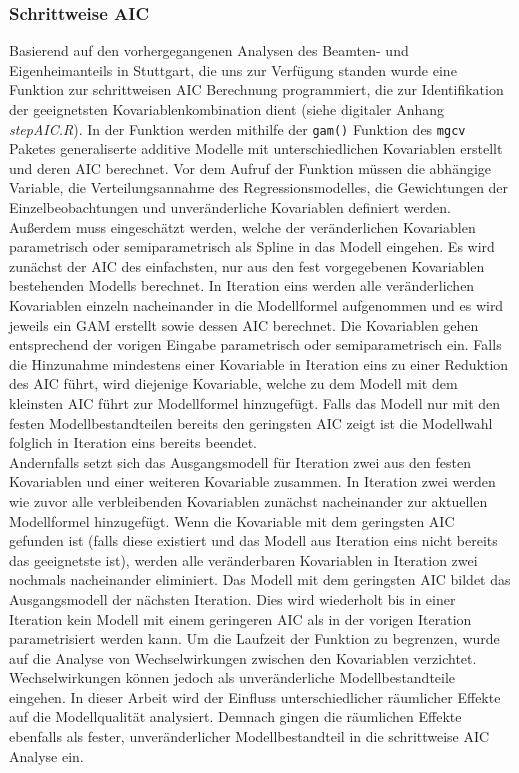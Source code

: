 \documentclass{Vorlage}
\begin{document}
\subsubsection{Schrittweise AIC}
Basierend auf den vorhergegangenen Analysen des Beamten- und Eigenheimanteils in Stuttgart, die uns zur Verfügung standen wurde eine Funktion zur schrittweisen AIC \cite{Akaike1981} Berechnung programmiert, die zur Identifikation der geeignetsten Kovariablenkombination dient (siehe digitaler Anhang \textit{stepAIC.R}). In der Funktion werden mithilfe der \texttt{gam()} Funktion des \texttt{mgcv} 
Paketes \cite{Wood2011} generaliserte additive Modelle mit unterschiedlichen Kovariablen erstellt und deren AIC 
berechnet. Vor dem Aufruf der Funktion müssen die abhängige Variable, die Verteilungsannahme des Regressionsmodelles, 
die Gewichtungen der Einzelbeobachtungen und unveränderliche Kovariablen definiert werden. Außerdem muss eingeschätzt 
werden, welche der veränderlichen Kovariablen parametrisch oder semiparametrisch als Spline in das Modell eingehen. Es 
wird zunächst der AIC des einfachsten, nur aus den fest vorgegebenen Kovariablen bestehenden Modells berechnet. In 
Iteration eins werden alle veränderlichen Kovariablen einzeln nacheinander in die Modellformel aufgenommen und es wird 
jeweils ein GAM erstellt sowie dessen AIC berechnet. Die Kovariablen gehen entsprechend der vorigen Eingabe parametrisch 
oder semiparametrisch ein. Falls die Hinzunahme mindestens einer Kovariable in Iteration eins zu einer Reduktion des AIC 
führt, wird diejenige Kovariable, welche zu dem Modell mit dem kleinsten AIC führt zur Modellformel hinzugefügt. Falls 
das Modell nur mit den festen Modellbestandteilen bereits den geringsten AIC zeigt ist die Modellwahl folglich in 
Iteration eins bereits beendet.\\ 
Andernfalls setzt sich das Ausgangsmodell für Iteration zwei aus den festen 
Kovariablen und einer weiteren Kovariable zusammen. In Iteration zwei werden wie zuvor alle verbleibenden Kovariablen 
zunächst nacheinander zur aktuellen Modellformel hinzugefügt. Wenn die Kovariable mit dem geringsten AIC gefunden ist 
(falls diese existiert und das Modell aus Iteration eins nicht bereits das geeignetste ist), werden alle veränderbaren 
Kovariablen in Iteration zwei nochmals nacheinander eliminiert. Das Modell mit dem geringsten AIC bildet das 
Ausgangsmodell der nächsten Iteration. Dies wird wiederholt bis in einer Iteration kein Modell mit einem geringeren AIC 
als in der vorigen Iteration parametrisiert werden kann. Um die Laufzeit der Funktion zu begrenzen, wurde auf die 
Analyse von Wechselwirkungen zwischen den Kovariablen verzichtet. Wechselwirkungen können jedoch als unveränderliche 
Modellbestandteile eingehen. In dieser Arbeit wird der Einfluss unterschiedlicher räumlicher Effekte auf die Modellqualität analysiert. Demnach gingen die räumlichen Effekte ebenfalls als fester, unveränderlicher Modellbestandteil in die schrittweise AIC Analyse ein.
\end{document}
